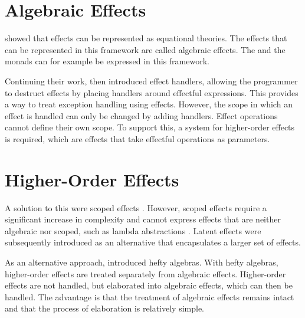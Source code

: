 \section{Algebraic Effects}\label{sec:alg}

\textcite{goos_adequacy_2001} showed that effects can be represented as equational theories. The effects that can be represented in this framework are called algebraic effects. The  and the  monads can for example be expressed in this framework.

Continuing their work, \textcite{castagna_handlers_2009} then introduced effect handlers, allowing the programmer to destruct effects by placing handlers around effectful expressions. This provides a way to treat exception handling using effects. However, the scope in which an effect is handled can only be changed by adding handlers. Effect operations cannot define their own scope. To support this, a system for higher-order effects is required, which are effects that take effectful operations as parameters.

\section{Higher-Order Effects}\label{sec:elab}

A solution to this were scoped effects \autocite{wu_effect_2014}. However, scoped effects require a significant increase in complexity and cannot express effects that are neither algebraic nor scoped, such as lambda abstractions \autocite{oh_latent_2021}. Latent effects \autocite{oh_latent_2021} were subsequently introduced as an alternative that encapsulates a larger set of effects.

As an alternative approach, \textcite{bach_poulsen_hefty_2023} introduced hefty algebras. With hefty algebras, higher-order effects are treated separately from algebraic effects. Higher-order effects are not handled, but elaborated into algebraic effects, which can then be handled. The advantage is that the treatment of algebraic effects remains intact and that the process of elaboration is relatively simple.

